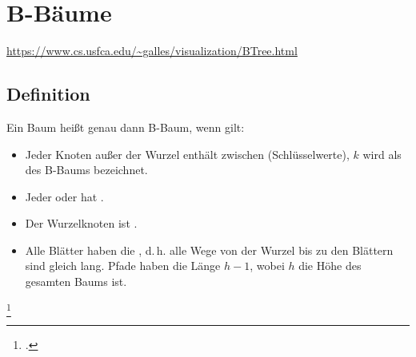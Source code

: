\documentclass{lehramt-informatik-haupt}
\begin{document}

\chapter{B-Bäume}

\begin{quellen}
\item \cite{wiki:bbaum}
\item \cite[Kapitel 14.4.3, Seite 386-399 (PDF 402-415)]{saake}
\item \cite[Kapitel 13.5.4.2 Balancierte Mehrwegbäume, Seite 464, wird
nur erwähnt, nicht beschrieben]{schneider}
\end{quellen}

\url{https://www.cs.usfca.edu/~galles/visualization/BTree.html}

%

\section{Definition}

Ein Baum heißt genau dann B-Baum, wenn gilt:
%

\begin{itemize}
\item Jeder Knoten außer der Wurzel enthält zwischen  (Schlüsselwerte), $k$ wird als  des B-Baums
bezeichnet.
%
\item Jeder  oder hat
.
%
\item Der Wurzelknoten ist .
%
\item Alle Blätter haben die , d.\,h. alle Wege von
der Wurzel bis zu den Blättern sind gleich lang. Pfade haben die Länge
$h-1$, wobei $h$ die Höhe des gesamten Baums ist.
\end{itemize}

\footcite[Seite 32 (PDF 26)]{aud:fs:5}

%
\end{document}
